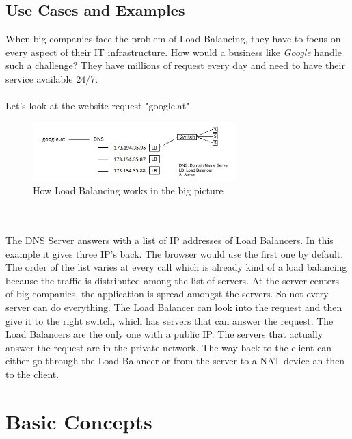 \documentclass[12p]{article}
\begin{document}
	\subsection{Use Cases and Examples}
	When big companies face the problem of Load Balancing, they have to focus on every aspect of their IT infrastructure. How would a business like \textit{Google} handle such a challenge? They have millions of request every day and need to have their service available 24/7. \\\\
	Let's look at the website request "google.at".\\
		\begin{figure}[h!]
			\centering
			\includegraphics[width=0.7\textwidth]{img/example}
			\caption{How Load Balancing works in the big picture}
		\end{figure}\\\\
 	The DNS Server answers with a list of IP addresses of Load Balancers. In this example it gives three IP's back. The browser would use the first one by default. The order of the list varies at every call which is already kind of a load balancing because the traffic is distributed among the list of servers. At the server centers of big companies, the application is spread amongst the servers. So not every server can do everything. The Load Balancer can look into the request and then give it to the right switch, which has servers that can answer the request. The Load Balancers are the only one with a public IP. The servers that actually answer the request are in the private network. The way back to the client can either go through the Load Balancer or from the server to a NAT device an then to the client.
	
	\newpage
	\section{Basic Concepts}
\end{document}
